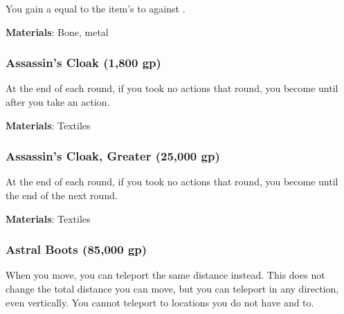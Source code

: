 You gain a  equal to the item's  to  against .



\vspace{0.25em}
\textbf{Materials}: Bone, metal


\lowercase{\hypertarget{item:Assassin's Cloak}{}}\label{item:Assassin's Cloak}
\hypertarget{item:Assassin's Cloak}{\subsubsection{Assassin's Cloak\hfill{} (1,800 gp)}}

At the end of each round, if you took no actions that round, you become  until after you take an action.



\vspace{0.25em}
\textbf{Materials}: Textiles


\lowercase{\hypertarget{item:Assassin's Cloak, Greater}{}}\label{item:Assassin's Cloak, Greater}
\hypertarget{item:Assassin's Cloak, Greater}{\subsubsection{Assassin's Cloak, Greater\hfill{} (25,000 gp)}}

At the end of each round, if you took no actions that round, you become  until the end of the next round.



\vspace{0.25em}
\textbf{Materials}: Textiles


\lowercase{\hypertarget{item:Astral Boots}{}}\label{item:Astral Boots}
\hypertarget{item:Astral Boots}{\subsubsection{Astral Boots\hfill{} (85,000 gp)}}

When you move, you can teleport the same distance instead.
This does not change the total distance you can move, but you can teleport in any direction, even vertically.
You cannot teleport to locations you do not have  and  to.



